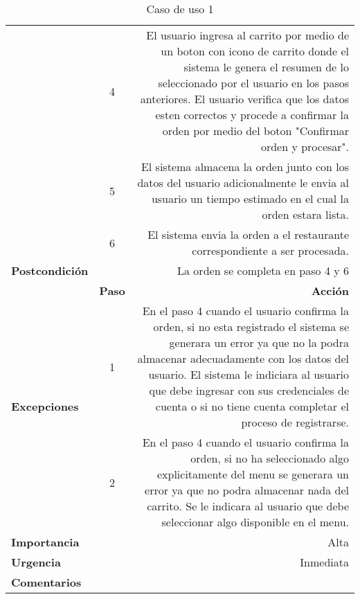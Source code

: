 \documentclass[conference]{IEEEtran}
\begin{document}
\begin{table}[H]
\begin{adjustbox}{width=0.45\textwidth}
\begin{tabular}{|p{11.215em}|r|r|}
\cmidrule{2-3}    \multicolumn{1}{|c|}{} & \multicolumn{1}{c|}{4} & \multicolumn{1}{p{32em}|}{El usuario ingresa al carrito por medio de un boton con icono de carrito donde el sistema le genera el resumen de lo seleccionado por el usuario en los pasos anteriores. El usuario verifica que los datos esten correctos y procede a confirmar la orden por medio del boton "Confirmar orden y procesar".} \\
\cmidrule{2-3}    \multicolumn{1}{|c|}{} & \multicolumn{1}{c|}{5} & \multicolumn{1}{p{32em}|}{El sistema almacena la orden junto con los datos del usuario adicionalmente le envia al usuario un tiempo estimado en el cual la orden estara lista.} \\
\cmidrule{2-3}    \multicolumn{1}{|c|}{} & \multicolumn{1}{c|}{6} & \multicolumn{1}{p{32em}|}{El sistema envia la orden a el restaurante correspondiente a ser procesada.} \\
    \midrule
    \textbf{Postcondición} & \multicolumn{2}{p{37.43em}|}{La orden se completa en paso 4 y 6} \\
    \midrule
    \multirow{3}[6]{*}{\textbf{Excepciones}} & \multicolumn{1}{p{5.43em}|}{\textbf{Paso}} & \multicolumn{1}{p{32em}|}{\textbf{Acción}} \\
\cmidrule{2-3}    \multicolumn{1}{|c|}{} & \multicolumn{1}{c|}{1} & \multicolumn{1}{p{32em}|}{En el paso 4 cuando el usuario confirma la orden, si no esta registrado el sistema se generara un error ya que no la podra almacenar adecuadamente con los datos del usuario. El sistema le indiciara al usuario que debe ingresar con sus credenciales de cuenta o si no tiene cuenta completar el proceso de registrarse.} \\
\cmidrule{2-3}    \multicolumn{1}{|c|}{} & \multicolumn{1}{c|}{2} & \multicolumn{1}{p{32em}|}{En el paso 4 cuando el usuario confirma la orden, si no ha seleccionado algo explicitamente del menu se generara un error ya que no podra almacenar nada del carrito. Se le indicara al usuario que debe seleccionar algo disponible en el menu.} \\
    \midrule
    \textbf{Importancia} & \multicolumn{2}{p{37.43em}|}{Alta} \\
    \midrule
    \textbf{Urgencia} & \multicolumn{2}{p{37.43em}|}{Inmediata} \\
    \midrule
    \textbf{Comentarios} & \multicolumn{2}{r|}{} \\
    \bottomrule
   \end{tabular}%
    \end{adjustbox}
    \vspace{0.3cm}
    \caption{Caso de uso 1}
  \label{tab:addlabel}%
\end{table}%
\end{document}
